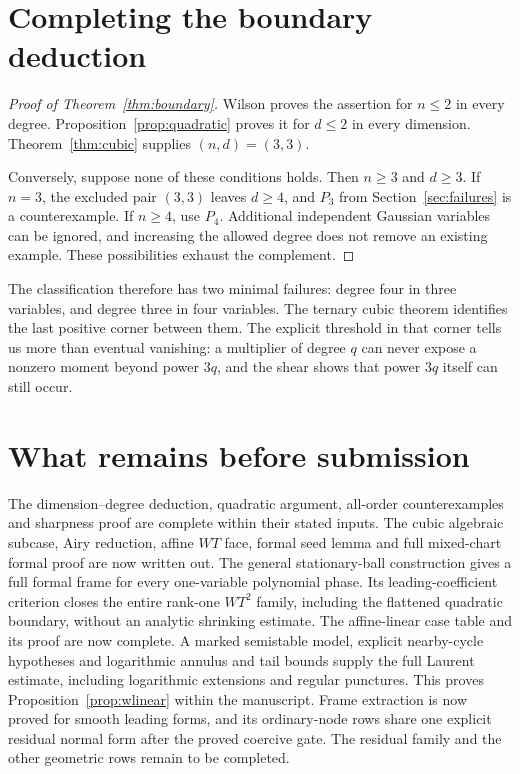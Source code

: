 \documentclass[11pt]{article}
\theoremstyle{definition}\newtheorem{definition}[theorem]{Definition}
\theoremstyle{remark}\newtheorem{remark}[theorem]{Remark}
\begin{document}
\section{Completing the boundary deduction}
\begin{proof}[Proof of Theorem~\ref{thm:boundary}]
Wilson proves the assertion for $n\leq2$ in every degree.
Proposition~\ref{prop:quadratic} proves it for $d\leq2$ in every
dimension. Theorem~\ref{thm:cubic} supplies $(n,d)=(3,3)$.

Conversely, suppose none of these conditions holds. Then $n\geq3$
and $d\geq3$. If $n=3$, the excluded pair $(3,3)$ leaves $d\geq4$,
and $P_3$ from Section~\ref{sec:failures} is a counterexample.
If $n\geq4$, use $P_4$. Additional independent Gaussian variables can
be ignored, and increasing the allowed degree does not remove an
existing example. These possibilities exhaust the complement.
\end{proof}

The classification therefore has two minimal failures: degree four
in three variables, and degree three in four variables. The ternary
cubic theorem identifies the last positive corner between them.
The explicit threshold in that corner tells us more than eventual
vanishing: a multiplier of degree $q$ can never expose a nonzero
moment beyond power $3q$, and the shear shows that power $3q$ itself
can still occur.

\section*{What remains before submission}
The dimension--degree deduction, quadratic argument, all-order
counterexamples and sharpness proof are complete within their stated
inputs. The cubic algebraic subcase, Airy reduction, affine $WT$ face,
formal seed lemma and full mixed-chart formal proof are now written out.
The general stationary-ball construction gives a full formal frame
for every one-variable polynomial phase. Its leading-coefficient
criterion closes the entire rank-one $WT^2$ family, including the
flattened quadratic boundary, without an analytic shrinking estimate.
The affine-linear case table and its proof are now complete.
A marked semistable model, explicit nearby-cycle hypotheses and
logarithmic annulus and tail bounds supply the full Laurent estimate,
including logarithmic extensions and regular punctures. This proves
Proposition~\ref{prop:wlinear} within the manuscript. Frame extraction
is now proved for smooth leading forms, and its ordinary-node rows
share one explicit residual normal form after the proved coercive gate.
The residual family and the other geometric rows remain to be completed.
\end{document}
